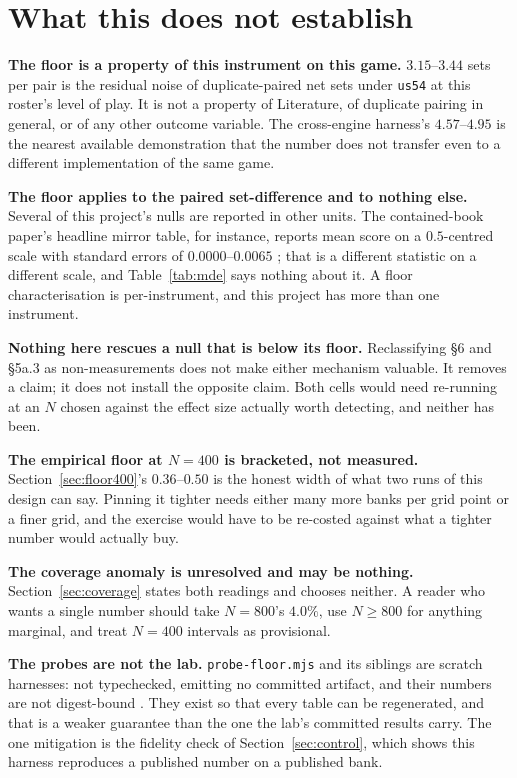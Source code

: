 \documentclass[11pt]{article}
\newcommand{\code}[1]{\texttt{#1}}
\newcommand{\usff}{\code{us54}}
\begin{document}
\section{What this does not establish}
\label{sec:limits}

\textbf{The floor is a property of this instrument on this game.} $3.15$--$3.44$ sets per pair is
the residual noise of duplicate-paired net sets under \usff{} at this roster's level of play. It is
not a property of Literature, of duplicate pairing in general, or of any other outcome variable. The
cross-engine harness's $4.57$--$4.95$ is the nearest available demonstration that the number does not
transfer even to a different implementation of the same game.

\textbf{The floor applies to the paired set-difference and to nothing else.} Several of this
project's nulls are reported in other units. The contained-book paper's headline mirror table, for
instance, reports mean score on a $0.5$-centred scale with standard errors of $0.0000$--$0.0065$
\cite{containedbook}; that is a different statistic on a different scale, and Table~\ref{tab:mde}
says nothing about it. A floor characterisation is per-instrument, and this project has more than one
instrument.

\textbf{Nothing here rescues a null that is below its floor.} Reclassifying \S6 and \S5a.3 as
non-measurements does not make either mechanism valuable. It removes a claim; it does not install
the opposite claim. Both cells would need re-running at an $N$ chosen against the effect size
actually worth detecting, and neither has been.

\textbf{The empirical floor at $N=400$ is bracketed, not measured.} Section~\ref{sec:floor400}'s
$0.36$--$0.50$ is the honest width of what two runs of this design can say. Pinning it tighter needs
either many more banks per grid point or a finer grid, and the exercise would have to be re-costed
against what a tighter number would actually buy.

\textbf{The coverage anomaly is unresolved and may be nothing.} Section~\ref{sec:coverage} states
both readings and chooses neither. A reader who wants a single number should take $N=800$'s $4.0\%$,
use $N \geq 800$ for anything marginal, and treat $N=400$ intervals as provisional.

\textbf{The probes are not the lab.} \code{probe-floor.mjs} and its siblings are scratch harnesses:
not typechecked, emitting no committed artifact, and their numbers are not digest-bound
\cite{concession}. They exist so that every table can be regenerated, and that is a weaker guarantee
than the one the lab's committed results carry. The one mitigation is the fidelity check of
Section~\ref{sec:control}, which shows this harness reproduces a published number on a published
bank.
\end{document}
